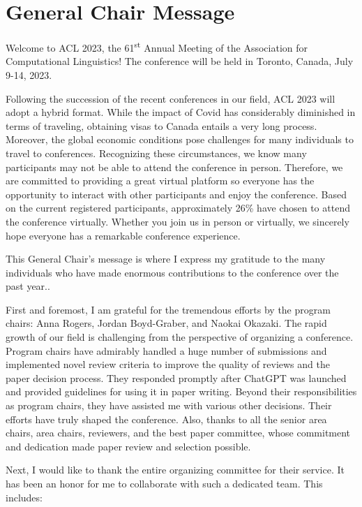 \section{General Chair Message}

Welcome to ACL 2023, the 61\textsuperscript{st} Annual Meeting of the Association for Computational Linguistics! The conference will be held in Toronto, Canada, July 9-14, 2023.

Following the succession of the recent conferences in our field, ACL 2023 will adopt a hybrid format. While the impact of Covid has considerably diminished in terms of traveling, obtaining visas to Canada entails a very long process. Moreover, the global economic conditions pose challenges for many individuals to travel to conferences. Recognizing these circumstances, we know many participants may not be able to attend the conference in person. Therefore, we are committed to providing a great virtual platform so everyone has the opportunity to interact with other participants and enjoy the conference. Based on the current registered participants, approximately 26\% have chosen to attend the conference virtually. Whether you join us in person or virtually, we sincerely hope everyone has a remarkable conference experience.


This General Chair's message is where I express my gratitude to the many individuals who have made enormous contributions to the conference over the past year..

First and foremost, I am grateful for the tremendous efforts by the program chairs: Anna Rogers, Jordan Boyd-Graber, and Naokai Okazaki. The rapid growth of our field is challenging from the perspective of organizing a conference. Program chairs have admirably handled a huge number of submissions and implemented novel review criteria to improve the quality of reviews and the paper decision process. They responded promptly after ChatGPT was launched and provided guidelines for using it in paper writing. Beyond their responsibilities as program chairs, they have assisted me with various other decisions. Their efforts have truly shaped the conference. Also, thanks to all the senior area chairs, area chairs, reviewers, and the best paper committee, whose commitment and dedication made paper review and selection possible.

Next, I would like to thank the entire organizing committee for their service. It has been an honor for me to collaborate with such a dedicated team. This includes:

